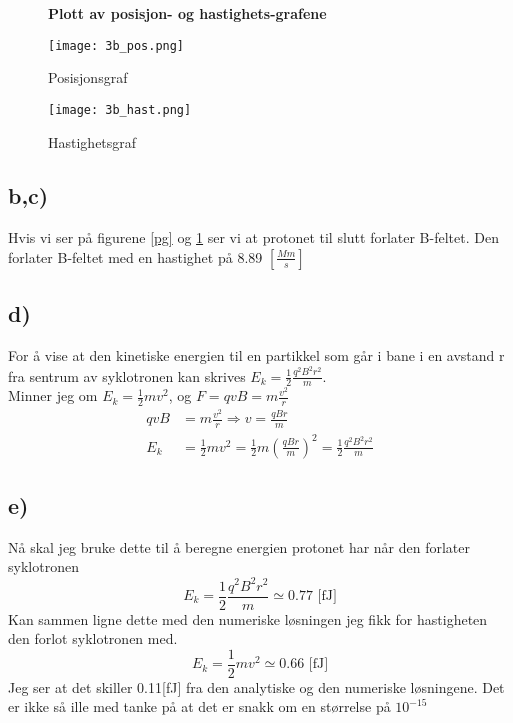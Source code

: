 \documentclass[a4paper,12pt,norsk]{article}
\begin{document}
\begin{figure}[h]
\begin{center}
\textbf{Plott av posisjon- og hastighets-grafene}\par\medskip
\end{center}
\begin{minipage}[b]{0.45\linewidth}
\centering
\texttt{[image: 3b\_pos.png]}
\caption{Posisjonsgraf}
\label{pg}
\end{minipage}
\hspace{0.5cm}
\begin{minipage}[b]{0.45\linewidth}
\centering
\texttt{[image: 3b\_hast.png]}
\caption{Hastighetsgraf}
\label{hg}
\end{minipage}
\end{figure}

\subsection{b,c)}
Hvis vi ser på figurene \ref{pg} og \ref{hg} ser vi at protonet til slutt forlater B-feltet. Den forlater B-feltet med en hastighet på 8.89 $\left[ \frac{Mm}{s}\right]$\\

\subsection{d)}
For å vise at den kinetiske energien til en partikkel som går i bane i en avstand r fra sentrum av syklotronen kan skrives $E_k=\frac{1}{2}\frac{q^2B^2r^2}{m}$.\\ 
Minner jeg om $E_k = \frac{1}{2}mv^2$, og $ F=qvB=m\frac{v^2}{r}$ 
\begin{align*}
qvB&=m\frac{v^2}{r} \Rightarrow v = \frac{qBr}{m}\\
E_k&=\frac{1}{2}mv^2 = \frac{1}{2}m \left(\frac{qBr}{m}\right)^2 = \frac{1}{2}\frac{q^2B^2r^2}{m}
\end{align*}

\subsection{e)}
Nå skal jeg bruke dette til å beregne energien protonet har når den forlater syklotronen 
$$E_k=\frac{1}{2}\frac{q^2B^2r^2}{m} \simeq 0.77 \text{ [fJ]}$$
Kan sammen ligne dette med den numeriske løsningen jeg fikk for hastigheten den forlot syklotronen med. 
$$E_k=\frac{1}{2}mv^2 \simeq 0.66 \text{ [fJ]}$$
Jeg ser at det skiller 0.11[fJ] fra den analytiske og den numeriske løsningene. Det er ikke så ille med tanke på at det er snakk om en størrelse på $10^{-15}$
\end{document}
